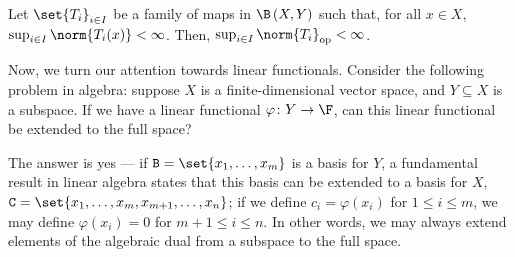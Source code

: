 \begin{theorem}\label{thm:uniform_boundedness}
  Let $\set{T_i}_{i\in I}$ be a family of maps in $\B\left(X,Y\right)$ such that, for all $x\in X$, $\sup_{i\in I}\norm{T_i(x)} < \infty$. Then, $\sup_{i\in I}\norm{T_i}_{\op} < \infty$.
\end{theorem}
Now, we turn our attention towards linear functionals. Consider the following problem in algebra: suppose $X$ is a finite-dimensional vector space, and $Y\subseteq X$ is a subspace. If we have a linear functional $\varphi\colon Y\rightarrow \F$, can this linear functional be extended to the full space?\newline

The answer is yes --- if $\mathcal{B} = \set{x_1,\dots,x_m}$ is a basis for $Y$, a fundamental result in linear algebra states that this basis can be extended to a basis for $X$, $\mathcal{C} = \set{x_1,\dots,x_m,x_{m+1},\dots,x_n}$; if we define $c_i = \varphi\left(x_i\right)$ for $1 \leq i \leq m$, we may define $\varphi\left(x_i\right) = 0$ for $m+1 \leq i \leq n$. In other words, we may always extend elements of the algebraic dual from a subspace to the full space.\newline

